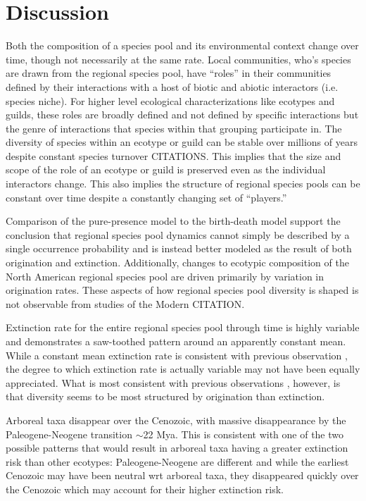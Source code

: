 \documentclass[12pt,letterpaper]{article}
\begin{document}
\section*{Discussion}

Both the composition of a species pool and its environmental context change over time, though not necessarily at the same rate. Local communities, who's species are drawn from the regional species pool, have ``roles'' in their communities defined by their interactions with a host of biotic and abiotic interactors (i.e. species niche). For higher level ecological characterizations like ecotypes and guilds, these roles are broadly defined and not defined by specific interactions but the genre of interactions that species within that grouping participate in. The diversity of species within an ecotype or guild can be stable over millions of years despite constant species turnover \citep{Jernvall2004,Slater2015c} CITATIONS. This implies that the size and scope of the role of an ecotype or guild is preserved even as the individual interactors change. This also implies the structure of regional species pools can be constant over time despite a constantly changing set of ``players.''

Comparison of the pure-presence model to the birth-death model support the conclusion that regional species pool dynamics cannot simply be described by a single occurrence probability and is instead better modeled as the result of both origination and extinction. Additionally, changes to ecotypic composition of the North American regional species pool are driven primarily by variation in origination rates. These aspects of how regional species pool diversity is shaped is not observable from studies of the Modern CITATION.


Extinction rate for the entire regional species pool through time is highly variable and demonstrates a saw-toothed pattern around an apparently constant mean. While a constant mean extinction rate is consistent with previous observation \citep{Alroy1996a,Alroy2000g}, the degree to which extinction rate is actually variable may not have been equally appreciated. What is most consistent with previous observations \citep{Alroy1996a,Alroy2000g}, however, is that diversity seems to be most structured by origination than extinction.


Arboreal taxa disappear over the Cenozoic, with massive disappearance by the Paleogene-Neogene transition \(\sim\)22 Mya. This is consistent with one of the two possible patterns that would result in arboreal taxa having a greater extinction risk than other ecotypes: Paleogene-Neogene are different and while the earliest Cenozoic may have been neutral wrt arboreal taxa, they disappeared quickly over the Cenozoic which may account for their higher extinction risk.
\end{document}
